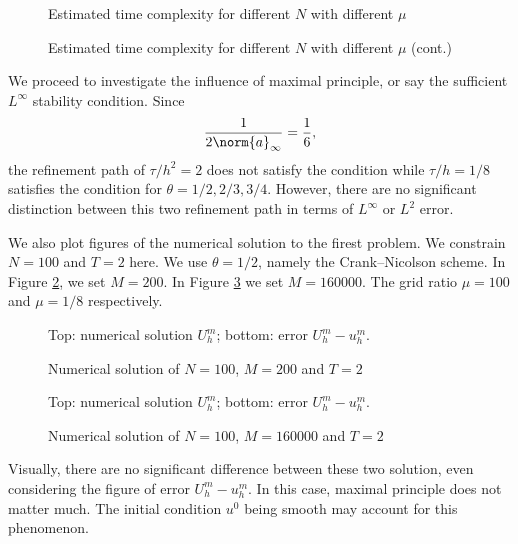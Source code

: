 \documentclass[english, nochinese]{pnote}
\begin{document}
\begin{figure}[htbp]
\centering
\scalebox{0.75}{}
\caption{Estimated time complexity for different $N$ with different $\mu$}
\label{Fig:Comp}
\end{figure}

\begin{figure}[htbp]
\ContinuedFloat
\centering
\scalebox{0.75}{}
\caption{Estimated time complexity for different $N$ with different $\mu$ (cont.)}
\end{figure}

We proceed to investigate the influence of maximal principle, or say the sufficient $L^{\infty}$ stability condition. Since
\begin{equation}
\frac{1}{ 2 \norm{a}_{\infty} } = \frac{1}{6},
\end{equation}
the refinement path of $ \tau / h^2 = 2 $ does not satisfy the condition while $ \tau / h = 1 / 8 $ satisfies the condition for $ \theta = 1 / 2, 2 / 3, 3 / 4 $. However, there are no significant distinction between this two refinement path in terms of $L^{\infty}$ or $L^2$ error.

We also plot figures of the numerical solution to the firest problem. We constrain $ N = 100 $ and $ T = 2 $ here. We use $ \theta = 1 / 2 $, namely the Crank--Nicolson scheme. In Figure \ref{Fig:Sol1}, we set $ M = 200 $. In Figure \ref{Fig:Sol2} we set $ M = 160000 $. The grid ratio $ \mu = 100 $ and $ \mu = 1 / 8 $ respectively.

\begin{figure}[htbp]
{
\centering





\caption{Numerical solution of $ N = 100 $, $ M = 200 $ and $ T = 2 $}
\label{Fig:Sol1}
}
{
\footnotesize Top: numerical solution $U_h^m$; bottom: error $ U_h^m - u_h^m $.
}
\end{figure}

\begin{figure}[htbp]
{
\centering





\caption{Numerical solution of $ N = 100 $, $ M = 160000 $ and $ T = 2 $}
\label{Fig:Sol2}
}
{
\footnotesize Top: numerical solution $U_h^m$; bottom: error $ U_h^m - u_h^m $.
}
\end{figure}

Visually, there are no significant difference between these two solution, even considering the figure of error $ U_h^m - u_h^m $. In this case, maximal principle does not matter much. The initial condition $u^0$ being smooth may account for this phenomenon.
\end{document}
